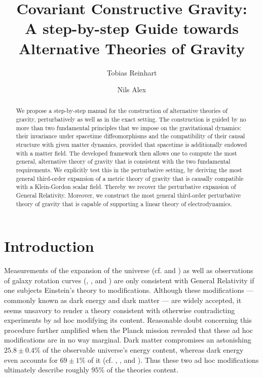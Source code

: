 \documentclass[%
preprint,
nofootinbib,
amsmath,amssymb,
aps,
prd,
floatfix,
]{revtex4-2}
\begin{document}

\title{Covariant Constructive Gravity:\\
A step-by-step Guide towards Alternative Theories of Gravity}

\author{Tobias Reinhart}
\author{Nils Alex}


\begin{abstract}
We propose a step-by-step manual for the construction of alternative theories of gravity, perturbatively as well as in the exact setting. The construction is guided by no more than two fundamental principles that we impose on the gravitational dynamics: their invariance under spacetime diffeomorphisms and the compatibility of their causal structure with given matter dynamics, provided that spacetime is additionally endowed with a matter field. The developed framework then allows one to compute the most general, alternative theory of gravity that is consistent with the two fundamental requirements. We explicitly test this in the perturbative setting, by deriving the most general third-order expansion of a metric theory of gravity that is causally compatible with a Klein-Gordon scalar field. Thereby we recover the perturbative expansion of General Relativity. Moreover, we construct the most general third-order perturbative theory of gravity that is capable of supporting a linear theory of electrodynamics.
\end{abstract}


\maketitle

\section{Introduction}
Measurements of the expansion of the universe (cf. \cite{1999ApJ...517..565P} and \cite{1998AJ....116.1009R}) as well as observations of galaxy rotation curves (\cite{1970ApJ...160..811F}, \cite{1970ApJ...159..379R}, and \cite{1980ApJ...238..471R}) are only consistent with General Relativity if one subjects Einstein's theory to modifications. Although these modifications --- commonly known as dark energy and dark matter --- are widely accepted, it seems unsavory to render a theory consistent with otherwise contradicting experiments by ad hoc modifying its content. Reasonable doubt concerning this procedure further amplified when the Planck mission revealed that these ad hoc modifications are in no way marginal. Dark matter compromises an astonishing $ 25.8\pm0.4\%$ of the observable universe's energy content, whereas dark energy even accounts for $ 69 \pm 1 \%$ of it (cf. \cite{Planck13_1}, \cite{Planck13_2}, \cite{Planck15} and \cite{Planck18}). Thus these two ad hoc modifications ultimately describe roughly $95\%$ of the theories content. 
\end{document}
